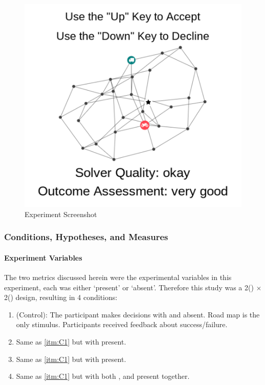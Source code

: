     \begin{figure}[tb]
        \centering
        \includegraphics[width=0.8\linewidth]{Figures/experiment_screenshot_Compressed.png}
        \caption{Experiment Screenshot}
        \label{fig:screenshot}
    \end{figure}

    \subsubsection{Conditions, Hypotheses, and Measures} \label{sec:hyp_cond_meas}
    \paragraph{Experiment Variables}
    The two \famsec{} metrics discussed herein were the experimental variables in this experiment, each was either `present' or `absent'. Therefore this study was a 2(\xQ) $\times$ 2(\xO) design, resulting in 4 conditions:

    \begin{enumerate}[label=\textbf{C\arabic*}]
        \item (Control): The participant makes decisions with \xQ{} and \xO{} absent. Road map is the only stimulus. Participants received feedback about success/failure. \label{itm:C1}
        \item Same as \ref{itm:C1} but with \xQ{} present.\label{itm:C2}
        \item Same as \ref{itm:C1} but with \xO{} present. \label{itm:C3}
        \item Same as \ref{itm:C1} but with both \xQ{}, and \xO{} present together. \label{itm:C4}
    \end{enumerate}


